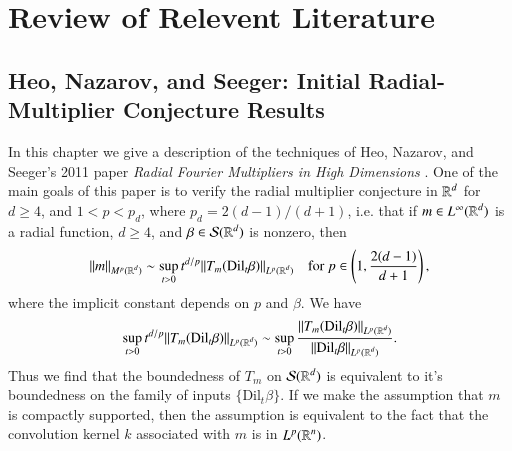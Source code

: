 
















\part{Review of Relevent Literature}

\chapter[HNS: Initial Radial-Multiplier Conjecture Bounds]{Heo, Nazarov, and Seeger: Initial Radial-Multiplier Conjecture Results} \label{HeoNazarovSeeger}

In this chapter we give a description of the techniques of Heo, Nazarov, and Seeger's 2011 paper \emph{Radial Fourier Multipliers in High Dimensions} \cite{HeoandNazarovandSeeger}. One of the main goals of this paper is to verify the radial multiplier conjecture in $\operatorname{\mathbb{R}}^d$ for $d \geq 4$, and $1 < p < p_d$, where $p_d = 2(d-1)/(d+1)$, i.e. that if $m \in L^\infty(\operatorname{\mathbb{R}}^d)$ is a radial function, $d \geq 4$, and $\beta \in \mathcal{S}(\operatorname{\mathbb{R}}^d)$ is nonzero, then
%
\[ \| m \|_{M^p(\operatorname{\mathbb{R}}^d)} \sim \sup_{t > 0} t^{d/p} \| T_m(\text{Dil}_t \beta) \|_{L^p(\operatorname{\mathbb{R}}^d)} \quad \text{for}\ p \in \left(1, \frac{2(d-1)}{d+1} \right), \]
%
where the implicit constant depends on $p$ and $\beta$. We have
%
\[ \sup_{t > 0} t^{d/p} \| T_m(\text{Dil}_t \beta) \|_{L^p(\operatorname{\mathbb{R}}^d)} \sim \sup_{t > 0} \frac{\| T_m(\text{Dil}_t \beta) \|_{L^p(\operatorname{\mathbb{R}}^d)}}{\| \text{Dil}_t \beta \|_{L^p(\operatorname{\mathbb{R}}^d)}}. \]
%
Thus we find that the boundedness of $T_m$ on $\mathcal{S}(\operatorname{\mathbb{R}}^d)$ is equivalent to it's boundedness on the family of inputs $\{ \text{Dil}_t \beta \}$. If we make the assumption that $m$ is compactly supported, then the assumption is equivalent to the fact that the convolution kernel $k$ associated with $m$ is in $L^p(\operatorname{\mathbb{R}}^n)$.

